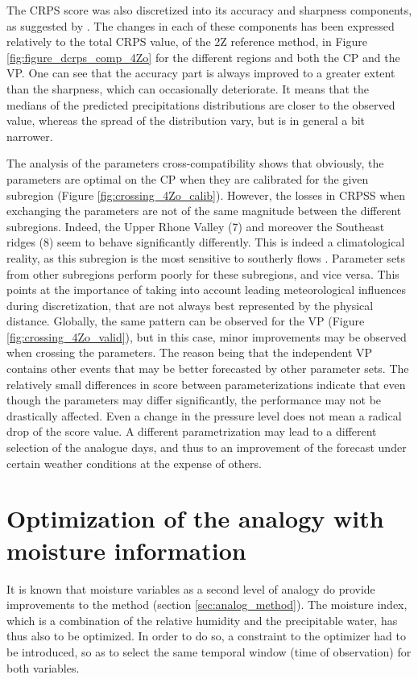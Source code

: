 \documentclass[review]{elsarticle}
\begin{document}
The CRPS score was also discretized into its accuracy and sharpness components, as suggested by \citet{Bontron2004}. The changes in each of these components has been expressed relatively to the total CRPS value, of the 2Z reference method, in Figure \ref{fig:figure_dcrps_comp_4Zo} for the different regions and both the CP and the VP. One can see that the accuracy part is always improved to a greater extent than the sharpness, which can occasionally deteriorate. It means that the medians of the predicted precipitations distributions are closer to the observed value, whereas the spread of the distribution vary, but is in general a bit narrower.

The analysis of the parameters cross-compatibility shows that obviously, the parameters are optimal on the CP when they are calibrated for the given subregion (Figure \ref{fig:crossing_4Zo_calib}). However, the losses in CRPSS when exchanging the parameters are not of the same magnitude between the different subregions. Indeed, the Upper Rhone Valley (7) and moreover the Southeast ridges (8) seem to behave significantly differently. This is indeed a climatological reality, as this subregion is the most sensitive to southerly flows \citep{Horton2012}. Parameter sets from other subregions perform poorly for these subregions, and vice versa. This points at the importance of taking into account leading meteorological influences during discretization, that are not always best represented by the physical distance. Globally, the same pattern can be observed for the VP (Figure \ref{fig:crossing_4Zo_valid}), but in this case, minor improvements may be observed when crossing the parameters. The reason being that the independent VP contains other events that may be better forecasted by other parameter sets. The relatively small differences in score between parameterizations indicate that even though the parameters may differ significantly, the performance may not be drastically affected. Even a change in the pressure level does not mean a radical drop of the score value. A different parametrization may lead to a different selection of the analogue days, and thus to an improvement of the forecast under certain weather conditions at the expense of others.


\section{Optimization of the analogy with moisture information}
\label{sec:optim_moisture}

It is known that moisture variables as a second level of analogy do provide improvements to the method (section \ref{sec:analog_method}). The moisture index, which is a combination of the relative humidity and the precipitable water, has thus also to be optimized. In order to do so, a constraint to the optimizer had to be introduced, so as to select the same temporal window (time of observation) for both variables. 
\end{document}
